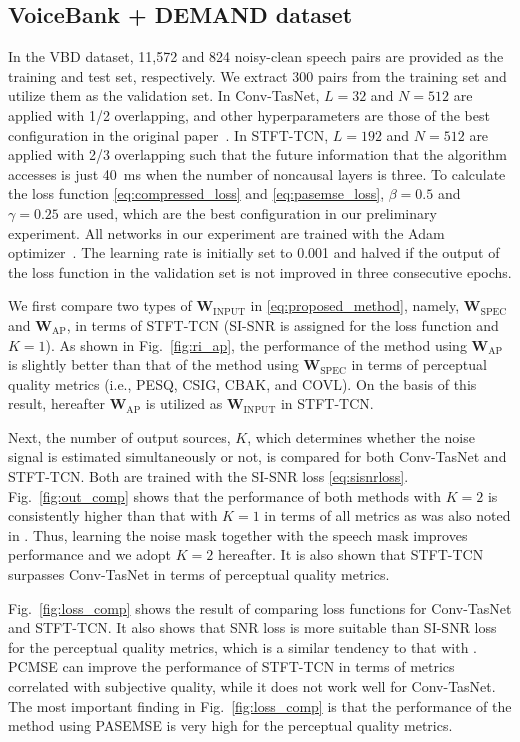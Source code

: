 \documentclass[a4paper]{article}
\begin{document}
\begin{spacing}{0.915}
\subsection{VoiceBank + DEMAND dataset}
In the VBD dataset, 11,572 and 824 noisy-clean speech pairs are provided as the training and test set, respectively.
We extract 300 pairs from the training set and utilize them as the validation set.
In Conv-TasNet, $L=32$ and $N=512$ are applied with 1/2 overlapping, and other hyperparameters are those of the best configuration in the original paper~\cite{luo2019conv}.
In STFT-TCN, $L=192$ and $N=512$ are applied with 2/3 overlapping such that the future information that the algorithm accesses is just 40~ms when the number of noncausal layers is three.
To calculate the loss function \eqref{eq:compressed_loss} and \eqref{eq:pasemse_loss}, $\beta=0.5$ and $\gamma=0.25$ are used, which are the best configuration in our preliminary experiment.
All networks in our experiment are trained with the Adam optimizer~\cite{kingma2014adam}.
The learning rate is initially set to 0.001 and halved if the output of the loss function in the validation set is not improved in three consecutive epochs.

We first compare two types of $\mathbf{W}_\text{INPUT}$ in \eqref{eq:proposed_method}, namely, $\mathbf{W}_\text{SPEC}$ and $\mathbf{W}_\text{AP}$, in terms of STFT-TCN (SI-SNR is assigned for the loss function and $K=1$).
As shown in Fig.~\ref{fig:ri_ap}, 
the performance of the method using $\mathbf{W}_\text{AP}$ is slightly better than that of the method using $\mathbf{W}_\text{SPEC}$ in terms of perceptual quality metrics (i.e., PESQ, CSIG, CBAK, and COVL).
On the basis of this result, hereafter $\mathbf{W}_\text{AP}$ is utilized as $\mathbf{W}_\text{INPUT}$ in STFT-TCN.


Next, the number of output sources, $K$, which determines whether the noise signal is estimated simultaneously or not, is compared for both Conv-TasNet and STFT-TCN.
Both are trained with the SI-SNR loss \eqref{eq:sisnrloss}.
Fig.~\ref{fig:out_comp} shows that 
the performance of both methods with $K=2$ is consistently higher than that with $K=1$ in terms of all metrics as was also noted in \cite{kinoshita2020improving}.
Thus, learning the noise mask together with the speech mask improves performance and we adopt $K=2$ hereafter.
It is also shown that
STFT-TCN surpasses Conv-TasNet in terms of perceptual quality metrics.

Fig.~\ref{fig:loss_comp} shows the result of comparing loss functions for Conv-TasNet and STFT-TCN.
It also shows that SNR loss is more suitable than SI-SNR loss for the perceptual quality metrics, which is a similar tendency to that with \cite{kinoshita2020improving}.
PCMSE can improve the performance of STFT-TCN in terms of metrics correlated with subjective quality, while it does not work well for Conv-TasNet.
The most important finding in Fig.~\ref{fig:loss_comp} is that 
the performance of the method using PASEMSE is very high for the perceptual quality metrics.


\end{spacing}
\end{document}
